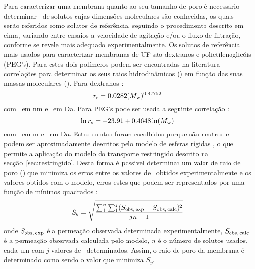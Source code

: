 Para caracterizar uma membrana quanto ao seu tamanho de poro é necessário determinar \permobs\ de solutos cujas dimensões moleculares são conhecidas, os quais serão referidos como solutos de referência, seguindo o procedimento descrito em cima, variando entre ensaios a velocidade de agitação e/ou o fluxo de filtração, conforme se revele mais adequado experimentalmente. Os solutos de referência mais usados para caracterizar membranas de UF são dextranos e polietilenoglicóis (PEG's). Para estes dois polímeros podem ser encontradas na literatura correlações para determinar os seus raios hidrodinâmicos (\raiostokes) em função das suas massas moleculares (\massamolecular). Para dextranos \cite{meu1}:
\begin{equation}
	\label{eq:rsdextrano_art}
	r_{\mathrm{s}} = 0.0282(M_\mathrm{w})^{0.47752}
\end{equation}
com \raiostokes\ em nm e \massamolecular\ em Da. Para PEG's pode ser usada a seguinte correlação \cite{moraotese}:
\begin{equation}
	\label{eq:rspeg_art}
	\ln r_{\mathrm{s}} = -23.91 + 0.4648 \ln (M_\mathrm{w})
\end{equation}
com \raiostokes\ em m e \massamolecular\ em Da. Estes solutos foram escolhidos porque são neutros e podem ser aproximadamente descritos pelo modelo de esferas rígidas \cite{deen,dechadilok,moraompa}, o que permite a aplicação do modelo do transporte restringido descrito na secção~\ref{sec:restringido}. Desta forma é possível determinar um valor de raio de poro (\raioporo) que minimiza os erros entre os valores de \permobs\ obtidos experimentalmente e os valores obtidos com o modelo, erros estes que podem ser representados por uma função de mínimos quadrados \cite{bowen02}:
\begin{equation}
	\label{eq:bowenSy}
	S_y = \sqrt{\frac{\sum_1^n\sum_1^j(S_{\mathrm{obs,\,exp}}-S_{\mathrm{obs,\,calc}})^2}{jn-1}}
\end{equation}%
onde $S_{\mathrm{obs,\,exp}}$ é a permeação observada determinada experimentalmente, $S_{\mathrm{obs,\,calc}}$ é a permeação observada calculada pelo modelo, $n$ é o número de solutos usados, cada um com $j$ valores de \permobs\ determinados. Assim, o raio de poro da membrana é determinado como sendo o valor que minimiza $S_y$. 

